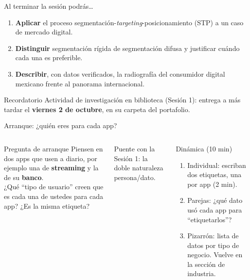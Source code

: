 \documentclass[aspectratio=169,xcolor=dvipsnames]{beamer}
\begin{document}
\begin{frame}{Al terminar la sesión podrás\ldots}
\begin{enumerate}
  \item \textbf{Aplicar} el proceso segmentación-\textit{targeting}-posicionamiento (STP) a un caso de mercado digital.
  \vspace{6pt}
  \item \textbf{Distinguir} segmentación rígida de segmentación difusa y justificar cuándo cada una es preferible.
  \vspace{6pt}
  \item \textbf{Describir}, con datos verificados, la radiografía del consumidor digital mexicano frente al panorama internacional.
\end{enumerate}
\vspace{8pt}
\begin{alertblock}{Recordatorio}
  Actividad de investigación en biblioteca (Sesión 1): entrega a más tardar el \textbf{viernes 2 de octubre}, en su carpeta del portafolio.
\end{alertblock}
\end{frame}

\begin{frame}{Arranque: ¿quién eres para cada app?}
\begin{columns}[T]
  \begin{exampleblock}{Pregunta de arranque}
    Piensen en dos apps que usen a diario, por ejemplo una de \textbf{streaming} y la de su \textbf{banco}.\\[4pt]
    ¿Qué \enquote{tipo de usuario} creen que es cada una de ustedes para cada app? ¿Es la misma etiqueta?
  \end{exampleblock}
  \vspace{4pt}
  {\small\color{IPNgris} Puente con la Sesión 1: la doble naturaleza persona/dato.}
  \begin{block}{Dinámica (10 min)}
    \small
    \begin{enumerate}
      \item Individual: escriban dos etiquetas, una por app (2 min).
      \item Parejas: ¿qué dato usó cada app para \enquote{etiquetarlos}?
      \item Pizarrón: lista de datos por tipo de negocio. Vuelve en la sección de industria.
    \end{enumerate}
  \end{block}
\end{columns}
\end{frame}
\end{document}
